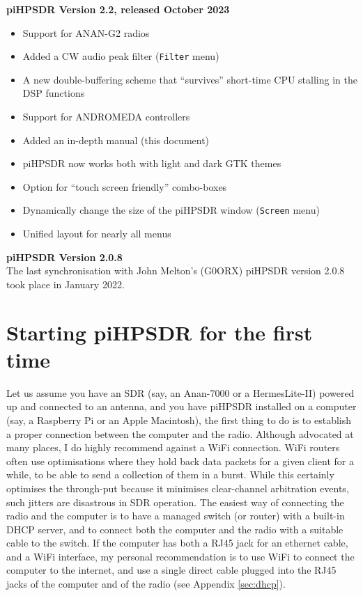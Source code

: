 \documentclass[12pt]{book}
\def\bltt#1{\texttt{\color{blue}#1}}
\def\pH{pi\-HPSDR\xspace}
\begin{document}
\medskip
\textbf{\pH Version 2.2, released October 2023}
\begin{itemize}
\item{Support for ANAN-G2 radios}
\item{Added a CW audio peak filter (\bltt{Filter} menu)}
\item{A new double-buffering scheme that ``survives'' short-time CPU stalling in the DSP functions}
\item{Support for ANDROMEDA controllers}
\item{Added an in-depth manual (this document)}
\item{\pH now works both with light and dark GTK themes}
\item{Option for ``touch screen friendly'' combo-boxes}
\item{Dynamically change the size  of the \pH window (\bltt{Screen} menu)}
\item{Unified layout for nearly all menus}
\end{itemize}

\medskip
\textbf{\pH Version 2.0.8}\\
The last synchronisation with John Melton's (G0ORX) \pH version 2.0.8 took place in January 2022.
\chapter{Starting \pH for the first time}
Let us assume you have an SDR (say, an Anan-7000 or a HermesLite-II) powered up and connected to an antenna,
and you have \pH installed on a computer (say, a Raspberry Pi or an Apple Macintosh), the first thing to
do is to establish a proper connection between the computer and the radio. Although advocated at many
places,
I do highly recommend against a WiFi connection. WiFi routers often use optimisations where they hold
back data packets for a given client for a while, to be able to send a collection of them in a burst. While
this certainly optimises the through-put because it minimises clear-channel arbitration events, such jitters
are disastrous in SDR operation. The easiest way of connecting the radio and the computer is to have a
managed switch (or router) with a built-in DHCP server, and to connect both the computer and the radio with a suitable
cable to the switch. If the computer has both a RJ45 jack for an ethernet cable, and a WiFi interface, my
personal recommendation is to use WiFi to connect the computer to the internet, and use a single direct
cable plugged
into the RJ45 jacks of the computer and of the radio (see Appendix
\ref{sec:dhcp}).
\end{document}
